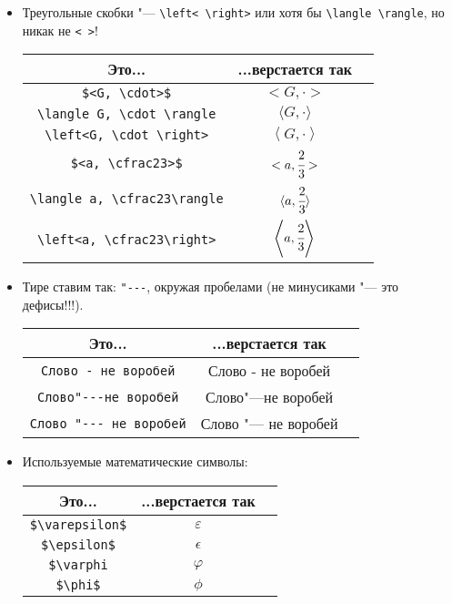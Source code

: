 \begin{enumerate}
\begin{itemize}
	\item 
		Треугольные скобки "--- \verb'\left< \right>' или хотя бы \verb'\langle \rangle', но никак не \verb'< >'!
		\begin{center}\begin{tabular}{|c|c|c|}
			\hline Это... & ...верстается так & \\
			\hline \verb'$<G, \cdot>$' & $<G, \cdot>$ \bad \\
			\hline \verb'\langle G, \cdot \rangle' & $\langle G, \cdot \rangle$ \ok \\
			\hline \verb'\left<G, \cdot \right>' & $\left<G, \cdot \right>$ \ok \\
			\hline \verb'$<a, \cfrac23>$' & $<a, \cfrac23>$ \bad \\
			\hline \verb'\langle a, \cfrac23\rangle' & $\langle a, \cfrac23\rangle$ \bad \\
			\hline \verb'\left<a, \cfrac23\right>' & $\left<a, \cfrac23\right>$ \ok \\
			\hline
		\end{tabular}\end{center}
	
	\item 
		Тире ставим так: \verb'"---', окружая пробелами (не минусиками "--- это дефисы!!!).
		\begin{center}\begin{tabular}{|c|c|c|}
			\hline Это... & ...верстается так & \\
			\hline \verb'Слово - не воробей' & Слово - не воробей \bad \\
			\hline \verb'Слово"---не воробей' & Слово"---не воробей \bad \\
			\hline \verb'Слово "--- не воробей' & Слово "--- не воробей \ok \\
			\hline
		\end{tabular}\end{center}

	\item
		Используемые математические символы:
		\begin{center}\begin{tabular}{|c|c|c|}
			\hline Это... & ...верстается так & \\
			\hline \verb'$\varepsilon$' & $\varepsilon$ \bad \\
			\hline \verb'$\epsilon$' & $\epsilon$ \ok \\
			\hline \verb'$\varphi' & $\varphi$ \bad \\
			\hline \verb'$\phi$' & $\phi$ \ok \\
			\hline
		\end{tabular}\end{center}
	\end{itemize}


\end{enumerate}
